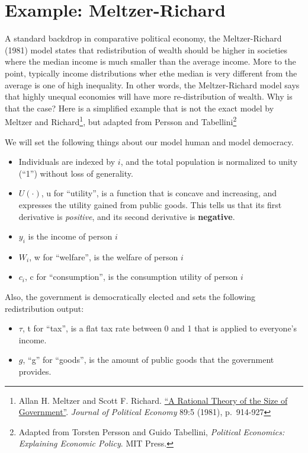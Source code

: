 \documentclass[]{book}
\providecommand{\tightlist}{%
  \setlength{\itemsep}{0pt}\setlength{\parskip}{0pt}}
\let\rmarkdownfootnote\footnote%
\def\footnote{\protect\rmarkdownfootnote}
\theoremstyle{definition}
\theoremstyle{definition}
\theoremstyle{definition}
\theoremstyle{remark}
\begin{document}
\hypertarget{example-meltzer-richard}{%
\section*{Example: Meltzer-Richard}\label{example-meltzer-richard}}

A standard backdrop in comparative political economy, the Meltzer-Richard (1981) model states that redistribution of wealth should be higher in societies where the median income is much smaller than the average income. More to the point, typically income distributions wher ethe median is very different from the average is one of high inequality. In other words, the Meltzer-Richard model says that highly unequal economies will have more re-distribution of wealth. Why is that the case? Here is a simplified example that is not the exact model by Meltzer and Richard\footnote{Allan H. Meltzer and Scott F. Richard. \href{https://www.jstor.org/stable/1830813}{``A Rational Theory of the Size of Government''}. \emph{Journal of Political Economy}
  89:5 (1981), p.~914-927}, but adapted from Persson and Tabellini\footnote{Adapted from Torsten Persson and Guido Tabellini, \emph{Political Economics: Explaining Economic Policy}. MIT Press. }

We will set the following things about our model human and model democracy.

\begin{itemize}
\tightlist
\item
  Individuals are indexed by \(i\), and the total population is normalized to unity (``1'') without loss of generality.
\item
  \(U(\cdot)\), u for ``utility'', is a function that is concave and increasing, and expresses the utility gained from public goods. This tells us that its first derivative is \emph{positive}, and its second derivative is \textbf{negative}.
\item
  \(y_i\) is the income of person \(i\)
\item
  \(W_i\), w for ``welfare'', is the welfare of person \(i\)
\item
  \(c_i\), c for ``consumption'', is the consumption utility of person \(i\)
\end{itemize}

Also, the government is democratically elected and sets the following redistribution output:

\begin{itemize}
\tightlist
\item
  \(\tau\), t for ``tax'', is a flat tax rate between 0 and 1 that is applied to everyone's income.
\item
  \(g\), ``g'' for ``goods'', is the amount of public goods that the government provides.
\end{itemize}
\end{document}
